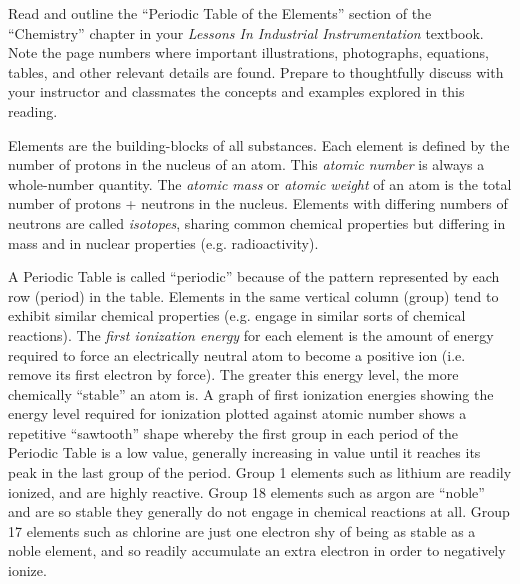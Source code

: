 
Read and outline the ``Periodic Table of the Elements'' section of the ``Chemistry'' chapter in your {\it Lessons In Industrial Instrumentation} textbook.  Note the page numbers where important illustrations, photographs, equations, tables, and other relevant details are found.  Prepare to thoughtfully discuss with your instructor and classmates the concepts and examples explored in this reading.














Elements are the building-blocks of all substances.  Each element is defined by the number of protons in the nucleus of an atom.  This {\it atomic number} is always a whole-number quantity.  The {\it atomic mass} or {\it atomic weight} of an atom is the total number of protons + neutrons in the nucleus.  Elements with differing numbers of neutrons are called {\it isotopes}, sharing common chemical properties but differing in mass and in nuclear properties (e.g. radioactivity).

\vskip 10pt

A Periodic Table is called ``periodic'' because of the pattern represented by each row (period) in the table.  Elements in the same vertical column (group) tend to exhibit similar chemical properties (e.g. engage in similar sorts of chemical reactions).  The {\it first ionization energy} for each element is the amount of energy required to force an electrically neutral atom to become a positive ion (i.e. remove its first electron by force).  The greater this energy level, the more chemically ``stable'' an atom is.  A graph of first ionization energies showing the energy level required for ionization plotted against atomic number shows a repetitive ``sawtooth'' shape whereby the first group in each period of the Periodic Table is a low value, generally increasing in value until it reaches its peak in the last group of the period.  Group 1 elements such as lithium are readily ionized, and are highly reactive.  Group 18 elements such as argon are ``noble'' and are so stable they generally do not engage in chemical reactions at all.  Group 17 elements such as chlorine are just one electron shy of being as stable as a noble element, and so readily accumulate an extra electron in order to negatively ionize. 


